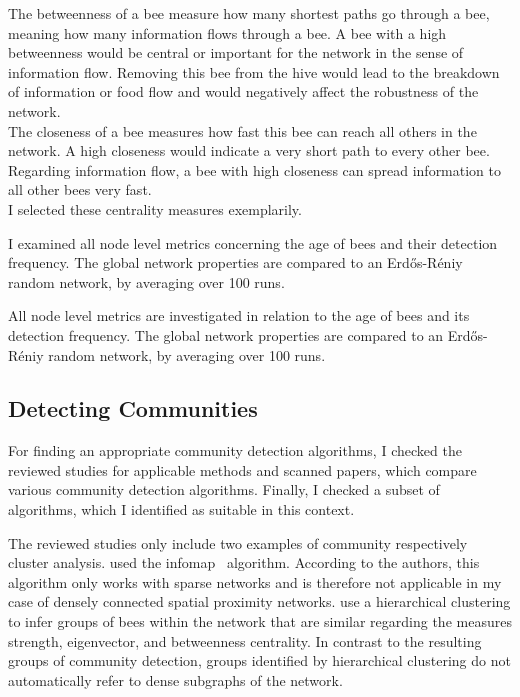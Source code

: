 The betweenness of a bee measure how many shortest paths go through a bee, meaning how many information flows through a bee. A bee with a high betweenness would be central or important for the network in the sense of information flow. Removing this bee from the hive would lead to the breakdown of information or food flow and would negatively affect the robustness of the network.\\
The closeness of a bee measures how fast this bee can reach all others in the network. A high closeness would indicate a very short path to every other bee. Regarding information flow, a bee with high closeness can spread information to all other bees very fast.\\
I selected these centrality measures exemplarily.

I examined all node level metrics concerning the age of bees and their detection frequency. The global network properties are compared to an Erdős-Réniy random network, by averaging over 100 runs.

All node level metrics are investigated in relation to the age of bees and its detection frequency.
The global network properties are compared to an Erd\H{o}s-R\'{e}niy random network, by averaging over 100 runs.\\




\subsection{Detecting Communities}
\label{subsec:APcommunityDet}
For finding an appropriate community detection algorithms, I checked the reviewed studies for applicable methods and scanned papers, which compare various community detection algorithms. Finally, I checked a subset of algorithms, which I identified as suitable in this context.

The reviewed studies only include two examples of community respectively cluster analysis. \textcite{mersch2013tracking} used the infomap~\cite{rosvall2009map,rosvall2007information} algorithm. According to the authors, this algorithm only works with sparse networks and is therefore not applicable in my case of densely connected spatial proximity networks. \textcite{baracchi2014socio} use a hierarchical clustering to infer groups of bees within the network that are similar regarding the measures strength, eigenvector, and betweenness centrality. In contrast to the resulting groups of community detection, groups identified by hierarchical clustering do not automatically refer to dense subgraphs of the network.

